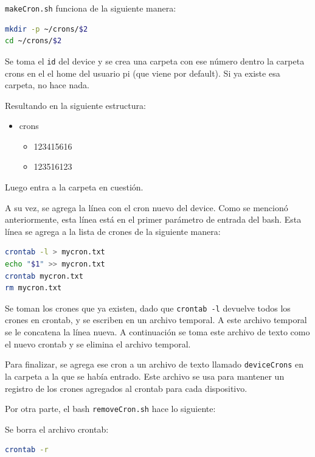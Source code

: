 \lstinline[columns=fixed]{makeCron.sh} funciona de la siguiente manera:

\begin{lstlisting}[language=bash]
mkdir -p ~/crons/$2 
cd ~/crons/$2 
\end{lstlisting}

Se toma el \lstinline[columns=fixed]{id} del device y se crea una carpeta con ese número dentro la carpeta crons en el el home del usuario pi (que viene por default). Si ya existe esa carpeta, no hace nada. 

Resultando en la siguiente estructura:
\begin{itemize}
  \item crons
  \begin{itemize}
    \item 123415616
    \item 123516123
  \end{itemize}
\end{itemize}

Luego entra a la carpeta en cuestión. 

A su vez, se agrega la línea con el cron nuevo del device. Como se mencionó anteriormente, esta línea está en el primer parámetro de entrada del bash. Esta línea se agrega a la lista de crones de la siguiente manera:

\begin{lstlisting}[language=bash]
crontab -l > mycron.txt
echo "$1" >> mycron.txt
crontab mycron.txt
rm mycron.txt
\end{lstlisting}

Se toman los crones que ya existen, dado que \lstinline[columns=fixed]{crontab -l} devuelve todos los crones en crontab, y se escriben en un archivo temporal. A este archivo temporal se le concatena la línea nueva. A continuación se toma este archivo de texto como el nuevo crontab y se elimina el archivo temporal.

Para finalizar, se agrega ese cron a un archivo de texto llamado \lstinline[columns=fixed]{deviceCrons} en la carpeta a la que se había entrado. Este archivo se usa para mantener un registro de los crones agregados al crontab para cada dispositivo.

Por otra parte, el bash \lstinline[columns=fixed]{removeCron.sh} hace lo siguiente:

Se borra el archivo crontab:
\begin{lstlisting}[language=bash]
crontab -r
\end{lstlisting}



